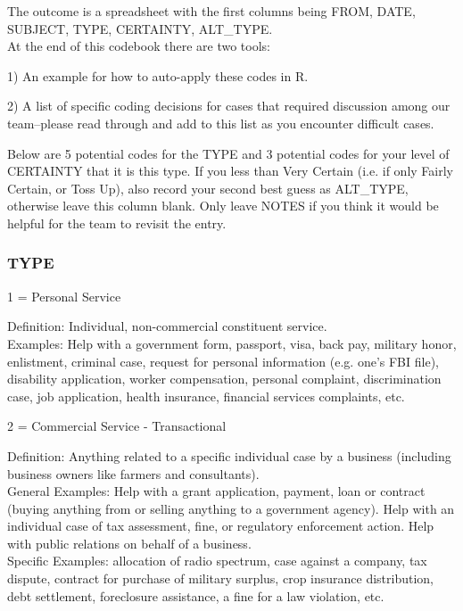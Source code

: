 \documentclass[12pt]{article}
\newenvironment{tight_itemize}{
\begin{itemize}
 \setlength{\itemsep}{0pt}
 \setlength{\parskip}{0pt}
 }{\end{itemize}}
\begin{document}
The outcome is a spreadsheet with the first columns being FROM, DATE, SUBJECT, TYPE, CERTAINTY, ALT\_TYPE.\\

At the end of this codebook there are two tools:
\begin{tight_itemize}
\item[1)] An example for how to auto-apply these codes in R. 
\item[2)] A list of specific coding decisions for cases that required discussion among our team--please read through and add to this list as you encounter difficult cases. 
\end{tight_itemize}

Below are 5 potential codes for the TYPE and 3 potential codes for your level of CERTAINTY that it is this type. If you less than Very Certain (i.e. if only Fairly Certain, or Toss Up), also record your second best guess as ALT\_TYPE, otherwise leave this column blank. Only leave NOTES if you think it would be helpful for the team to revisit the entry.

\subsubsection{TYPE}

1 = Personal Service\\

\hfill\begin{minipage}{\dimexpr\textwidth-2cm}
Definition: Individual, non-commercial constituent service.\\
Examples: Help with a government form, passport, visa, back pay, military honor, enlistment, criminal case, request for personal information (e.g. one’s FBI file), disability application, worker compensation, personal complaint, discrimination case, job application, health insurance, financial services complaints, etc.\\
\end{minipage}

2 = Commercial Service - Transactional \\

\hfill\begin{minipage}{\dimexpr\textwidth-2cm}
Definition: Anything related to a specific individual case by a business (including business owners like farmers and consultants).\\ 
General Examples: Help with a grant application, payment, loan or contract (buying anything from or selling anything to a government agency). Help with an individual case of tax assessment, fine, or regulatory enforcement action. Help with public relations on behalf of a business.\\
Specific Examples: allocation of radio spectrum, case against a company, tax dispute, contract for purchase of military surplus, crop insurance distribution, debt settlement, foreclosure assistance, a fine for a law violation, etc. \\
\end{minipage}
\end{document}
